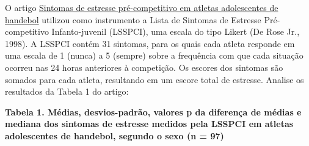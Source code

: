 \documentclass[
]{book}
\begin{document}
O artigo \href{https://www.scielo.br/j/rbce/a/WkdgtTdkykSVHJ9rGYGh7Lx/?format=pdf&lang=pt}{Sintomas de estresse pré-competitivo em atletas adolescentes de handebol} utilizou como instrumento a Lista de Sintomas de Estresse Pré-competitivo Infanto-juvenil (LSSPCI), uma escala do tipo Likert (De Rose Jr., 1998). A LSSPCI contém 31 sintomas, para os quais cada atleta responde em uma escala de 1 (nunca) a 5 (sempre) sobre a frequência com que cada situação ocorreu nas 24 horas anteriores à competição. Os escores dos sintomas são somados para cada atleta, resultando em um escore total de estresse. Analise os resultados da Tabela 1 do artigo:

\textbf{Tabela 1. Médias, desvios-padrão, valores p da diferença de médias e mediana dos sintomas de estresse medidos pela LSSPCI em atletas adolescentes de handebol, segundo o sexo (n = 97)}
\end{document}
